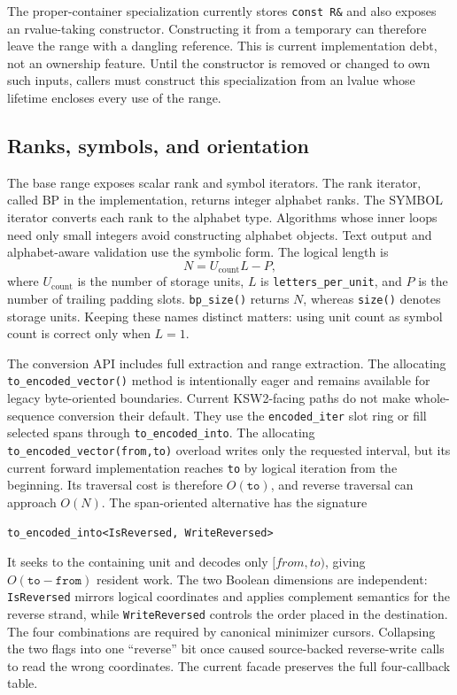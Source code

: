 The proper-container specialization currently stores \texttt{const R\&} and
also exposes an rvalue-taking constructor.  Constructing it from a temporary
can therefore leave the range with a dangling reference.  This is current
implementation debt, not an ownership feature.  Until the constructor is
removed or changed to own such inputs, callers must construct this
specialization from an lvalue whose lifetime encloses every use of the range.

\subsection{Ranks, symbols, and orientation}

The base range exposes scalar rank and symbol iterators.  The rank iterator,
called BP in the implementation, returns integer alphabet ranks.  The SYMBOL
iterator converts each rank to the alphabet type.  Algorithms whose inner loops
need only small integers avoid constructing alphabet objects.  Text output and
alphabet-aware validation use the symbolic form.  The logical length is
\[
  N = U_{\mathrm{count}}L - P,
\]
where \(U_{\mathrm{count}}\) is the number of storage units,
\(L\) is \texttt{letters\_per\_unit}, and \(P\) is the number of trailing
padding slots.  \texttt{bp\_size()} returns \(N\), whereas
\texttt{size()} denotes storage units.  Keeping these names distinct matters:
using unit count as symbol count is correct only when \(L=1\).

The conversion API includes full extraction and range extraction.  The
allocating \texttt{to\_encoded\_vector()} method is intentionally eager and
remains available for legacy byte-oriented boundaries.  Current KSW2-facing
paths do not make whole-sequence conversion their default.  They use the
\texttt{encoded\_iter} slot ring or fill selected spans through
\texttt{to\_encoded\_into}.  The allocating
\texttt{to\_encoded\_vector(from,to)} overload writes only the requested
interval, but its current forward implementation reaches \texttt{to} by
logical iteration from the beginning.  Its traversal cost is therefore
\(O(\mathtt{to})\), and reverse traversal can approach \(O(N)\).
The span-oriented alternative has the signature
\begin{center}
\small\texttt{to\_encoded\_into<IsReversed, WriteReversed>}
\end{center}
It seeks to the containing unit and decodes only \([from,to)\), giving
\(O(\mathtt{to}-\mathtt{from})\) resident work.  The two Boolean dimensions are
independent:
\texttt{IsReversed} mirrors logical coordinates and applies complement
semantics for the reverse strand, while \texttt{WriteReversed} controls the
order placed in the destination.  The four combinations are required by
canonical minimizer cursors.  Collapsing the two flags into one ``reverse''
bit once caused source-backed reverse-write calls to read the wrong
coordinates.  The current facade preserves the full four-callback table.

